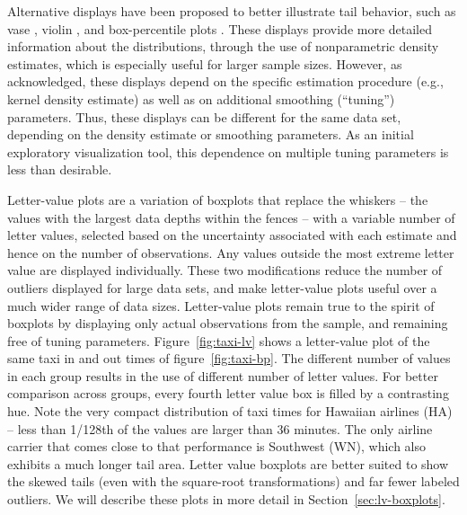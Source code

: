 \documentclass[12pt,oneside]{article}
\begin{document}

Alternative displays have been proposed to better illustrate tail behavior,
such as vase \citep{vase}, violin \citep{violin}, and box-percentile plots
\citep{box.percentiles}. These displays provide more detailed information
about the distributions, through the use of nonparametric density estimates,
which is especially useful for larger sample sizes. However, as \citet{vase}
acknowledged, these displays depend on the specific estimation procedure
(e.g., kernel density estimate) as well as on additional smoothing
(``tuning'') parameters. Thus, these displays can be different for the same
data set, depending on the density estimate or smoothing parameters. As an
initial exploratory visualization tool, this dependence on multiple tuning
parameters is less than desirable.

Letter-value plots are a variation of boxplots that replace the whiskers -- the values with the largest data depths within the fences --   with
a variable number of letter values, selected based on the uncertainty
associated with each estimate and hence on the number of observations. Any
values outside the most extreme letter value are displayed individually. These
two modifications reduce the number of outliers displayed for large data
sets, and make letter-value plots useful over a much wider range of data
sizes. Letter-value plots remain true to the spirit of boxplots by displaying
only actual observations from the sample, and remaining free of tuning
parameters. Figure~\ref{fig:taxi-lv} shows  a
letter-value plot of the same taxi in and out times of figure~\ref{fig:taxi-bp}. The different number of values in each group results in the use of different number of letter values. For better comparison across groups, every fourth letter value box is filled by a contrasting hue. Note the very compact distribution of taxi times for Hawaiian airlines (HA) -- less than 1/128th of the values are larger than 36 minutes. The only airline carrier that comes close to that performance is Southwest (WN), which also exhibits a much longer tail area.
Letter value boxplots are better suited to show the  skewed tails (even with the
square-root transformations) and far fewer labeled outliers. We will describe these plots in more detail in Section~\ref{sec:lv-boxplots}. 
\end{document}
